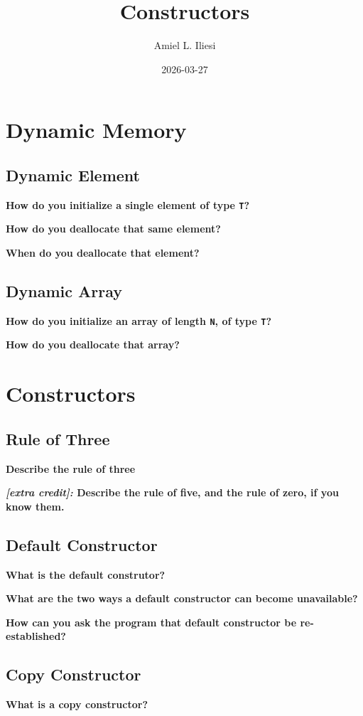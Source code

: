 \documentclass[letterpaper, 12pt]{article}
\title{Constructors}
\author{Amiel L. Iliesi}
\date{2026-03-27}
\newcommand{\question}[2][4em]{\textbf{#2}\vspace{#1}\par}
\begin{document}
\maketitle

\tableofcontents

\pagebreak
\section{Dynamic Memory}

\subsection{Dynamic Element}
\question{How do you initialize a single element of type \texttt{T}?}
\question{How do you deallocate that same element?}
\question{When do you deallocate that element?}

\subsection{Dynamic Array}
\question{How do you initialize an array of length \texttt{N}, of type
\texttt{T}?}

\question{How do you deallocate that array?}

\pagebreak
\section{Constructors}

\subsection{Rule of Three}
\question{Describe the rule of three}

\question{\textit{[extra credit]:} Describe the rule of five, and the rule of
zero, if you know them.}

\subsection{Default Constructor}
\question{What is the default construtor?}

\question{What are the two ways a default constructor can become unavailable?}

\question{How can you ask the program that default constructor be
re-established?}

\subsection{Copy Constructor}
\question{What is a copy constructor?}
\end{document}
